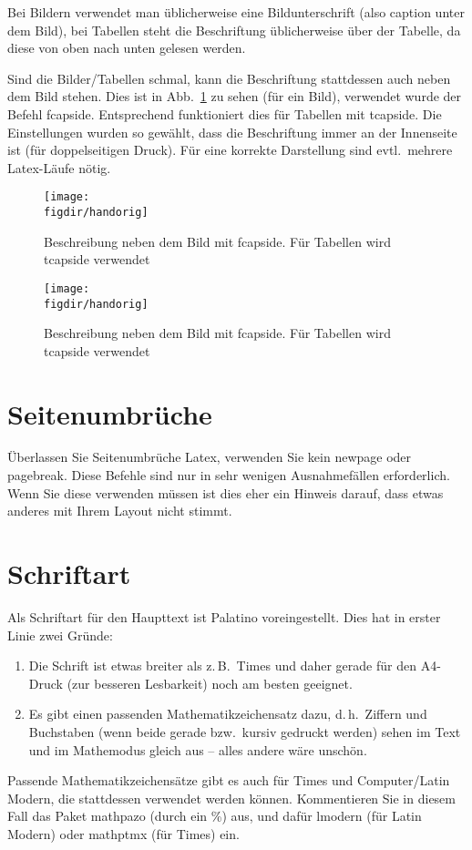 Bei Bildern verwendet man üblicherweise eine Bildunterschrift (also caption  unter dem Bild), bei Tabellen steht die Beschriftung üblicherweise über der Tabelle, da diese von oben nach unten gelesen werden.

Sind die Bilder/Tabellen schmal, kann die Beschriftung stattdessen auch neben dem Bild stehen.
Dies ist in Abb.\ \ref{fig:beschreibung-neben-bild} zu sehen (für ein Bild), verwendet wurde der Befehl fcapside.
Entsprechend funktioniert dies für Tabellen mit tcapside.
Die Einstellungen wurden so gewählt, dass die Beschriftung immer an der Innenseite ist (für doppelseitigen Druck).
Für eine korrekte Darstellung sind evtl.\ mehrere Latex-Läufe nötig.

\begin{figure}[t]
\fcapside
{\caption{Beschreibung neben dem Bild mit fcapside. Für Tabellen wird tcapside verwendet}
\label{fig:beschreibung-neben-bild}}
{\texttt{[image: \\figdir/handorig]}}
\end{figure}

\begin{figure}[t]
\fcapside
{\caption{Beschreibung neben dem Bild mit fcapside. Für Tabellen wird tcapside verwendet}
\label{fig:beschreibung-neben-bild-2}}
{\texttt{[image: \\figdir/handorig]}}
\end{figure}


\section{Seitenumbrüche}
Überlassen Sie Seitenumbrüche Latex, verwenden Sie kein newpage oder pagebreak.
Diese Befehle sind nur in sehr wenigen Ausnahmefällen erforderlich.
Wenn Sie diese verwenden müssen ist dies eher ein Hinweis darauf, dass etwas anderes mit Ihrem Layout nicht stimmt.

\section{Schriftart}
Als Schriftart für den Haupttext ist Palatino voreingestellt.
Dies hat in erster Linie zwei Gründe:
\begin{enumerate}
\item
Die Schrift ist etwas breiter als z.\,B.\ Times und daher gerade für den A4-Druck (zur besseren Lesbarkeit) noch am besten geeignet.
\item
Es gibt einen passenden Mathematikzeichensatz dazu, d.\,h.\ Ziffern und Buchstaben (wenn beide gerade bzw.\ kursiv gedruckt werden) sehen im Text und im Mathemodus gleich aus -- alles andere wäre unschön.
\end{enumerate}
Passende Mathematikzeichensätze gibt es auch für Times und Computer/Latin Modern, die stattdessen verwendet werden können.
Kommentieren Sie in diesem Fall das Paket mathpazo (durch ein \%) aus, und dafür lmodern (für Latin Modern) oder mathptmx (für Times) ein.

